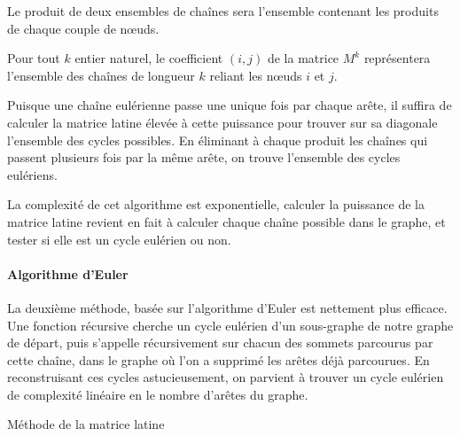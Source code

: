       Le produit de deux ensembles de chaînes sera l'ensemble contenant les
      produits de chaque couple de nœuds.

      Pour tout $k$ entier naturel, le coefficient $(i,j)$ de la matrice $M^k$
      représentera l'ensemble des chaînes de longueur $k$ reliant les nœuds $i$
      et $j$.
      
      Puisque une chaîne eulérienne passe une unique fois par chaque arête, il
      suffira de calculer la matrice latine élevée à cette puissance pour
      trouver sur sa diagonale l'ensemble des cycles possibles. En éliminant à
      chaque produit les chaînes qui passent plusieurs fois par la même arête,
      on trouve l'ensemble des cycles eulériens.

      La complexité de cet algorithme est exponentielle, calculer la puissance
      de la matrice latine revient en fait à calculer chaque chaîne possible dans
      le graphe, et tester si elle est un cycle eulérien ou non.
	
    \paragraph{Algorithme d'Euler}
      La deuxième méthode, basée sur l'algorithme d'Euler est nettement plus
      efficace. Une fonction récursive cherche un cycle eulérien d'un
      sous-graphe de notre graphe de départ, puis s'appelle récursivement sur
      chacun des sommets parcourus par cette chaîne, dans le graphe où l'on a
      supprimé les arêtes déjà parcourues. En reconstruisant ces cycles
      astucieusement, on parvient à trouver un cycle eulérien de complexité
      linéaire en le nombre d'arêtes du graphe. 

    \begin{algorithm}
      \caption{Méthode de la matrice latine}
      \label{alg:meth_mat_lat}
    \end{algorithm}


